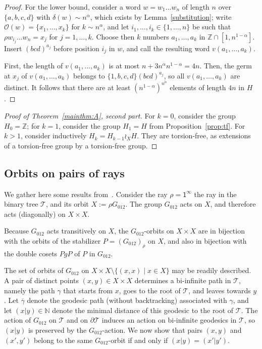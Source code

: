 \documentclass{amsart}
\newcommand\Z{\mathbb{Z}}
\newcommand\N{\mathbb{N}}
\newcommand\Grig{{G_{012}}}
\theoremstyle{definition}
\begin{document}
\begin{proof}
  For the lower bound, consider a word $w=w_1\dots w_n$ of length $n$
  over $\{a,b,c,d\}$ with $\delta(w)\sim n^\alpha$, which exists by
  Lemma~\ref{substitution}; write $\mathcal O(w)=\{x_1,\dots,x_k\}$
  for $k\sim n^\alpha$, and let $i_1,\dots,i_k\in\{1,\dots,n\}$ be
  such that $\rho w_{i_j}\dots w_n=x_j$ for $j=1,\dots,k$.  Choose
  then $k$ numbers $a_1,\dots,a_k$ in $\Z\cap[1,n^{1-\alpha}]$. Insert
  $(bcd)^{a_j}$ before position $i_j$ in $w$, and call the resulting
  word $v(a_1,\dots,a_k)$.

  First, the length of $v(a_1,\dots,a_k)$ is at most $n+3n^\alpha
  n^{1-\alpha}=4n$. Then, the germ at $x_j$ of $v(a_1,\dots,a_k)$
  belongs to $\{1,b,c,d\}(bcd)^{a_j}$, so all $v(a_1,\dots,a_k)$ are
  distinct. It follows that there are at least
  $(n^{1-\alpha})^{n^\alpha}$ elements of length $4n$ in $H$.
\end{proof}

\begin{proof}[Proof of Theorem~\ref{mainthm:A}, second part]
  For $k=0$, consider the group $H_0=\Z$; for $k=1$, consider the
  group $H_1=H$ from Proposition~\ref{prop:tf}. For $k>1$, consider
  inductively $H_k=H_{k-1}\wr_X H$. They are torsion-free, as
  extensions of a torsion-free group by a torsion-free group.
\end{proof}

\subsection{Orbits on pairs of rays}
We gather here some results
from~\cite{bartholdi-g:parabolic}. Consider the ray
$\rho=\mathsf1^\infty$ the ray in the binary tree $\mathcal T$, and
its orbit $X:=\rho\Grig$. The group $\Grig$ acts on $X$, and therefore
acts (diagonally) on $X\times X$.

Because $\Grig$ acts transitively on $X$, the $\Grig$-orbits on
$X\times X$ are in bijection with the orbits of the stabilizer
$P=(\Grig)_\rho$ on $X$, and also in bijection with the double cosets
$PgP$ of $P$ in $\Grig$.

The set of orbits of $\Grig$ on $X\times X\setminus\{(x,x)\mid x\in
X\}$ may be readily described. A pair of distinct points $(x,y)\in
X\times X$ determines a bi-infinite path in $\mathcal T$, namely the
path $\gamma$ that starts from $x$, goes to the root of $\mathcal T$,
and leaves towards $y$. Let $\overline\gamma$ denote the geodesic path
(without backtracking) associated with $\gamma$, and let $(x|y)\in\N$
denote the minimal distance of this geodesic to the root of $\mathcal
T$.  The action of $\Grig$ on $\mathcal T$ and on $\partial\mathcal T$
induces an action on bi-infinite geodesics in $\mathcal T$, so $(x|y)$
is preserved by the $\Grig$-action. We now show that pairs $(x,y)$ and
$(x',y')$ belong to the same $\Grig$-orbit if and only if
$(x|y)=(x'|y')$.
\end{document}
